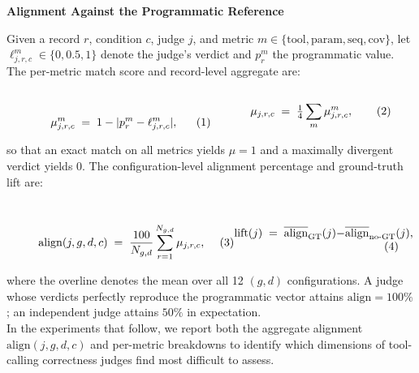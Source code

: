 \textbf{Alignment Against the Programmatic Reference}
\label{sec:methodology:alignment}

Given a record $r$, condition $c$, judge $j$, and metric $m \in \{\text{tool}, \text{param}, \text{seq}, \text{cov}\}$, let $\ell^{m}_{j,r,c} \in \{0, 0.5, 1\}$ denote the judge's verdict and $p^{m}_r$ the programmatic value. The per-metric match score and record-level aggregate are:

\begin{subequations}
\begin{minipage}[t]{0.46\linewidth}
\vspace{0pt}
\begin{equation}
\mu^{m}_{j,r,c} \;=\; 1 - \lvert p^{m}_r - \ell^{m}_{j,r,c} \rvert,
\label{eq:per-metric-match}
\end{equation}
\end{minipage}%
\hfill
\begin{minipage}[t]{0.46\linewidth}
\vspace{0pt}
\begin{equation}
\mu_{j,r,c} \;=\; \tfrac{1}{4} \sum_{m} \mu^{m}_{j,r,c},
\label{eq:overall_alignment}
\end{equation}
\end{minipage}
\end{subequations}

\noindent so that an exact match on all metrics yields $\mu = 1$ and a maximally divergent verdict yields $0$. The configuration-level alignment percentage and ground-truth lift are:

\begin{subequations}
\begin{minipage}[t]{0.54\linewidth}
\vspace{0pt}
\begin{equation}
\mathrm{align}(j, g, d, c) \;=\; \frac{100}{N_{g,d}} \sum_{r=1}^{N_{g,d}} \mu_{j,r,c},
\label{eq:alignment}
\end{equation}
\end{minipage}%
\hfill
\begin{minipage}[t]{0.42\linewidth}
\vspace{0pt}
\begin{equation}
\mathrm{lift}(j) \;=\; \overline{\mathrm{align}}_{\text{GT}}(j) - \overline{\mathrm{align}}_{\text{no-GT}}(j),
\label{eq:lift}
\end{equation}
\end{minipage}
\end{subequations}

\noindent where the overline denotes the mean over all 12 $(g, d)$ configurations. A judge whose verdicts perfectly reproduce the programmatic vector attains $\mathrm{align} = 100\%$; an independent judge attains $50\%$ in expectation. \\
In the experiments that follow, we report both the aggregate alignment $\mathrm{align}(j, g, d, c)$ and per-metric breakdowns to identify which dimensions of tool-calling correctness judges find most difficult to assess.
